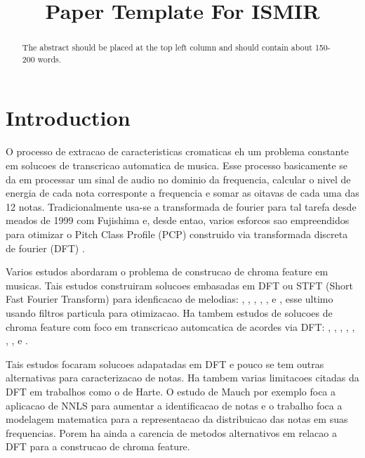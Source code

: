 \documentclass{article}
\title{Paper Template For ISMIR \conferenceyear}
\begin{document}
%
\maketitle
%
\begin{abstract}
The abstract should be placed at the top left column and should contain about 150-200 words.
\end{abstract}
%
\section{Introduction}\label{sec:introduction}


	O processo de extracao de caracteristicas cromaticas eh um problema constante em solucoes de transcricao automatica de musica. Esse processo basicamente se da em processar um sinal de audio no dominio da frequencia, calcular o nivel de energia de cada nota corresponte a frequencia e somar as oitavas de cada uma das 12 notas. Tradicionalmente usa-se a transformada de fourier para tal tarefa desde meados de 1999 com Fujishima \cite{fujishima1999realtime} e, desde entao, varios esforcos sao empreendidos para otimizar o Pitch Class Profile (PCP) construido via transformada discreta de fourier (DFT) .

	Varios estudos abordaram o problema de construcao de chroma feature em musicas. Tais estudos construiram solucoes embasadas em DFT ou STFT (Short Fast Fourier Transform) para idenficacao de melodias: \cite{muto2002transcription}, \cite{al2008time}, \cite{barbancho2009transcription}, \cite{gomez2004automatic}, \cite{tangmelody}, \cite{eggink2004extracting} e \cite{jo2010melody}, esse ultimo usando filtros particula para otimizacao. Ha tambem estudos de solucoes de chroma feature com foco em transcricao automcatica de acordes via DFT:
	\cite{harte2009automatic}, \cite{khadkevich2011time}, \cite{harte2010towards}, \cite{peeters2006chroma}, \cite{cho2010exploring} \cite{lee2006automatic}, \cite{de2012improving}, \cite{boulanger2013audio}, \cite{chen2012chord} e \cite{hrybyk2010combined}.

	Tais estudos focaram solucoes adapatadas em DFT e pouco se tem outras alternativas para caracterizacao de notas. Ha tambem varias limitacoes citadas da DFT em trabalhos como o de Harte\cite{harte2010towards}. O estudo de Mauch\cite{mauch2010approximate} por exemplo foca a aplicacao de NNLS para aumentar a identificacao de notas e o trabalho \cite{wakefield1999mathematical} foca a modelagem matematica	para a representacao da distribuicao das notas em suas frequencias. Porem ha ainda a carencia de metodos alternativos em relacao a DFT para a construcao de chroma feature.
\end{document}

